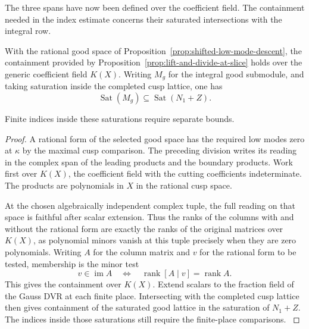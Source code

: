The three spans have now been defined over the coefficient field. The containment needed in the index estimate concerns their saturated intersections with the integral row.

\begin{proposition}
\label{prop:descent-of-slice-division}
With the rational good space of Proposition~\ref{prop:shifted-low-mode-descent},
the containment provided by Proposition~\ref{prop:lift-and-divide-at-slice}
holds over the generic coefficient field \(K(X)\). Writing \(M_g\) for the integral good submodule, and taking saturation inside the completed cusp lattice, one has
\[
 \operatorname{Sat}(M_g)\subseteq\operatorname{Sat}(N_1+Z).
\]

Finite indices inside these saturations require separate bounds.
\end{proposition}

\begin{proof}
A rational form of the selected good space has the required
low modes zero at \(\kappa\) by the maximal cusp comparison.
The preceding division writes its reading in the complex
span of the leading products and the boundary products.
Work first over \(K(X)\), the coefficient field with the
cutting coefficients indeterminate. The products are
polynomials in \(X\) in the rational cusp space.

At the
chosen algebraically independent complex tuple, the
full reading on that space is faithful after scalar
extension. Thus the ranks of the columns with and
without the rational form are exactly the ranks of the
original matrices over \(K(X)\), as polynomial minors
vanish at this tuple precisely when they are zero
polynomials.
Writing \(A\) for the column matrix and \(v\) for the rational form to be tested, membership is the minor test
\[
  v\in\operatorname{im}A\quad\Longleftrightarrow\quad \operatorname{rank}[A\mid v]=\operatorname{rank}A .
\]
 This gives the containment over \(K(X)\).
Extend scalars to the fraction field of the Gauss DVR
at each finite place. Intersecting with the completed cusp
lattice then gives containment of the saturated good
lattice in the saturation of \(N_1+Z\). The indices inside
those saturations still require the finite-place comparisons.
\label{cor:slice-short-division-3}
\end{proof}
